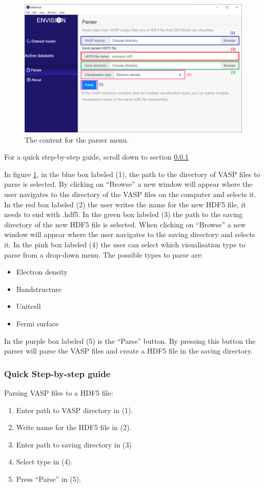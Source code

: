 \begin{figure}[H]
    \centering
    \includegraphics[scale = 0.45]{images/GUI_Parserstart.png}
    \caption{The content for the parser menu.}
    \label{fig:GUIParser}
\end{figure}

For a quick step-by-step guide, scroll down to section \ref{sec:Parse step-by-step} 

In figure \ref{fig:GUIParser}, in the blue box labeled (1), the path to the directory of VASP files to parse is selected. By clicking on ``Browse'' a new window will appear where the user navigates to the directory of the VASP files on the computer and selects it. In the red box labeled (2) the user writes the name for the new HDF5 file, it needs to end with .hdf5. In the green box labeled (3) the path to the saving directory of the new HDF5 file is selected. When clicking on ``Browse'' a new window will appear where the user navigates to the saving directory and selects it. In the pink box labeled (4) the user can select which visualisation type to parse from a drop-down menu. The possible types to parse are:

\begin{itemize}
    \item Electron density
    \item Bandstructure
    \item Unitcell
    \item Fermi surface
\end{itemize}

In the purple box labeled (5) is the ``Parse'' button. By pressing this button the parser will parse the VASP files and create a HDF5 file in the saving directory. 

\subsubsection{Quick Step-by-step guide}
\label{sec:Parse step-by-step}
Parsing VASP files to a HDF5 file:
\begin{enumerate}
    \item Enter path to VASP directory in (1).
    \item Write name for the HDF5 file in (2).
    \item Enter path to saving directory in (3)
    \item Select type in (4).
    \item Press ``Parse'' in (5).
\end{enumerate}

